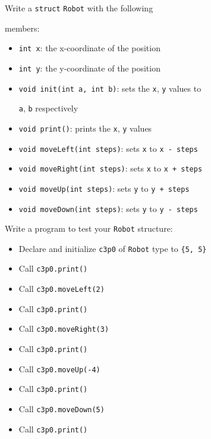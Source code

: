 Write a \texttt{struct} \texttt{Robot} with the following

members:



\begin{itemize}

\item \texttt{int x}: the x-coordinate of the position

\item \texttt{int y}: the y-coordinate of the position

\item \texttt{void init(int a, int b)}: sets the \texttt{x}, \texttt{y} values to

  \texttt{a}, \texttt{b} respectively

\item \texttt{void print()}: prints the \texttt{x}, \texttt{y} values

\item \texttt{void moveLeft(int steps)}: sets \texttt{x} to \texttt{x - steps}

\item \texttt{void moveRight(int steps)}: sets \texttt{x} to \texttt{x + steps}

\item \texttt{void moveUp(int steps)}: sets \texttt{y} to \texttt{y + steps}

\item \texttt{void moveDown(int steps)}: sets \texttt{y} to \texttt{y - steps}

\end{itemize}



Write a program to test your \texttt{Robot} structure:

\begin{itemize}

\item Declare and initialize \texttt{c3p0} of \texttt{Robot} type to \texttt{\{5, 5\}}

\item Call \texttt{c3p0.print()}

\item Call \texttt{c3p0.moveLeft(2)}

\item Call \texttt{c3p0.print()}

\item Call \texttt{c3p0.moveRight(3)}

\item Call \texttt{c3p0.print()}

\item Call \texttt{c3p0.moveUp(-4)}

\item Call \texttt{c3p0.print()}

\item Call \texttt{c3p0.moveDown(5)}

\item Call \texttt{c3p0.print()}

\end{itemize}

